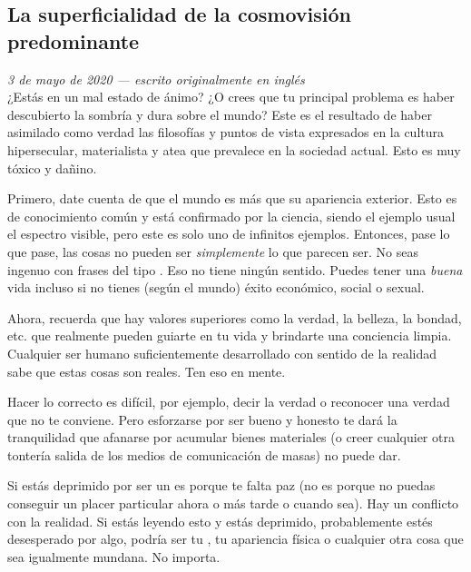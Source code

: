 \documentclass[12pt]{article}
\begin{document}
	\newpage

	\subsection{La superficialidad de la cosmovisión predominante}
	\setcounter{footnote}{0}

	\textit{3 de mayo de 2020 --- escrito originalmente en inglés}\\

	¿Estás en un mal estado de ánimo? ¿O crees que tu principal problema es
	haber descubierto la sombría y dura  sobre el mundo?
	Este es el resultado de haber asimilado como verdad las filosofías y
	puntos de vista expresados en la cultura hipersecular, materialista y
	atea que prevalece en la sociedad actual. Esto es muy tóxico y dañino.

	Primero, date cuenta de que el mundo es más que su apariencia exterior.
	Esto es de conocimiento común y está confirmado por la ciencia, siendo
	el ejemplo usual el espectro visible, pero este es solo uno de infinitos
	ejemplos. Entonces, pase lo que pase, las cosas no pueden ser
	\textit{simplemente} lo que parecen ser. No seas ingenuo con frases del
	tipo . Eso no
	tiene ningún sentido. Puedes tener una \textit{buena} vida incluso si no
	tienes (según el mundo) éxito económico, social o sexual.

	Ahora, recuerda que hay valores superiores como la verdad, la belleza,
	la bondad, etc. que realmente pueden guiarte en tu vida y brindarte una
	conciencia limpia. Cualquier ser humano suficientemente desarrollado con
	sentido de la realidad sabe que estas cosas son reales. Ten eso en
	mente.

	Hacer lo correcto es difícil, por ejemplo, decir la verdad o reconocer
	una verdad que no te conviene. Pero esforzarse por ser bueno y honesto
	te dará la tranquilidad que afanarse por acumular bienes materiales (o
	creer cualquier otra tontería salida de los medios de comunicación
	de masas) no puede dar.

	Si estás deprimido por ser un  es porque te falta
	paz (no es porque no puedas conseguir un placer particular ahora o más
	tarde o cuando sea). Hay un conflicto con la realidad. Si estás leyendo
	esto y estás deprimido, probablemente estés desesperado por algo,
	podría ser tu , tu apariencia física o
	cualquier otra cosa que sea igualmente mundana. No importa.
\end{document}
